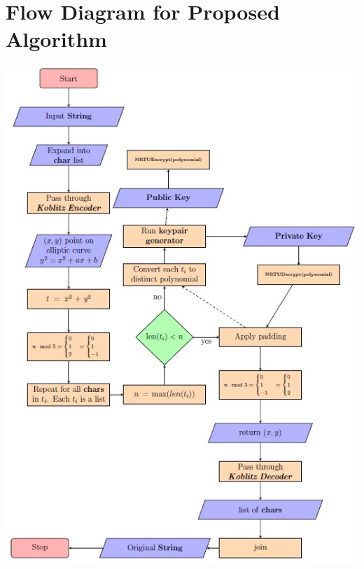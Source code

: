 \documentclass[a4paper,12pt]{article}
\begin{document}
\section{Flow Diagram for Proposed Algorithm}
\begin{center}
    \includegraphics[scale=1.25]{images/Algorithm Flow Diagram.jpg}
\end{center}

\newpage
\end{document}
